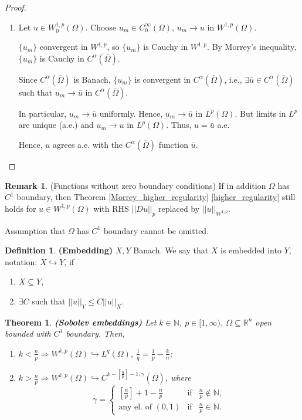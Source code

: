 \documentclass[12pt]{article}
\newtheorem{theorem}{Theorem}[section]
\theoremstyle{definition}
\newtheorem*{definition*}{Definition}
\newtheorem*{remark}{Remark}
\begin{document}
\begin{proof}
\begin{enumerate}[label=\alph*)]
\item Let $u\in W_0^{1,p}(\Omega)$. Choose $u_m\in C_0^\infty(\Omega)$, $u_m\rightarrow u$ in $W^{1,p}(\Omega)$.

$\{u_m\}$ convergent in $W^{1,p}$, so $\{u_m\}$ is Cauchy in $W^{1,p}$. By Morrey's inequality, $\{u_m\}$ is Cauchy in $C^\alpha(\overline\Omega)$.

Since $C^\alpha(\overline\Omega)$ is Banach, $\{u_m\}$ is convergent in $C^\alpha(\overline\Omega)$, i.e., $\exists\bar u\in C^\alpha(\overline\Omega)$ such that $u_m\rightarrow\bar u$ in $C^\alpha(\overline\Omega)$.

In particular, $u_m\rightarrow\bar u$ uniformly. Hence, $u_m\rightarrow\bar u$ in $L^p(\Omega)$. But limits in $L^p$ are unique (a.e.) and $u_m\rightarrow u$ in $L^p(\Omega)$. Thus, $u=\bar u$ a.e.

Hence, $u$ agrees a.e. with the $C^\alpha(\overline\Omega)$ function $\bar u$.
\end{enumerate}
\end{proof}

\begin{remark}
(Functions without zero boundary conditions) If in addition $\Omega$ has $C^1$ boundary, then Theorem \ref{Morrey_higher_regularity} \ref{higher_regularity} still holds for $u\in W^{1,p}(\Omega)$ with RHS $||Du||_p$ replaced by $||u||_{W^{1,p}}$.

Assumption that $\Omega$ has $C^1$ boundary cannot be omitted.
\end{remark}

\begin{definition*}
\textbf{(Embedding)} $X,Y$ Banach. We say that $X$ is embedded into $Y$, notation: $X\hookrightarrow Y$, if
\begin{enumerate}[label=(\roman*)]
\item $X\subseteq Y$,
\item $\exists C$ such that $||u||_Y\leq C||u||_X$.
\end{enumerate}
\end{definition*}

\begin{theorem}\label{Sobolev_embeddings}
\emph{\textbf{(Sobolev embeddings)}} Let $k\in\mathbb N$, $p\in[1,\infty)$, $\Omega\subseteq\mathbb R^n$ open bounded with $C^1$ boundary. Then,
\begin{enumerate}[label=\alph*)]
\item\label{embedding_L} $k<\frac np\Longrightarrow W^{k,p}(\Omega)\hookrightarrow L^q(\Omega)$, $\frac1q=\frac1p-\frac kn$;
\item\label{embedding_C} $k>\frac np\Longrightarrow W^{k,p}(\Omega)\hookrightarrow C^{k-\left[\frac np\right]-1,\gamma}(\overline\Omega)$, where
\[\gamma=\left\{\begin{array}{rcl}\left[\frac np\right]+1-\frac np&\text{if}&\frac np\notin\mathbb N,\\\text{any el. of }(0,1)&\text{if}&\frac np\in\mathbb N.\end{array}\right.\]
\end{enumerate}
\end{theorem}
\end{document}
